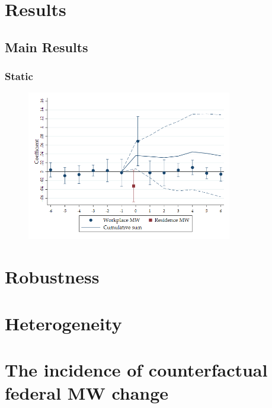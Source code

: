 \documentclass[aspectratio=169, t]{beamer}
\begin{document}
\section{Results}

\subsection{Main Results}

\begin{frame}
    \frametitle{Static }
    
\end{frame}

\begin{frame}
	\begin{figure}
		\centering
		\vspace{-2mm}
		\includegraphics[width=0.8\textwidth]{fd_baseline/output/fd_baseline_exp_ln_mw_17_dynamic.png}
	\end{figure}   
\end{frame}


\section{Robustness}

\section{Heterogeneity}

\section{The incidence of counterfactual federal MW change}
\end{document}
